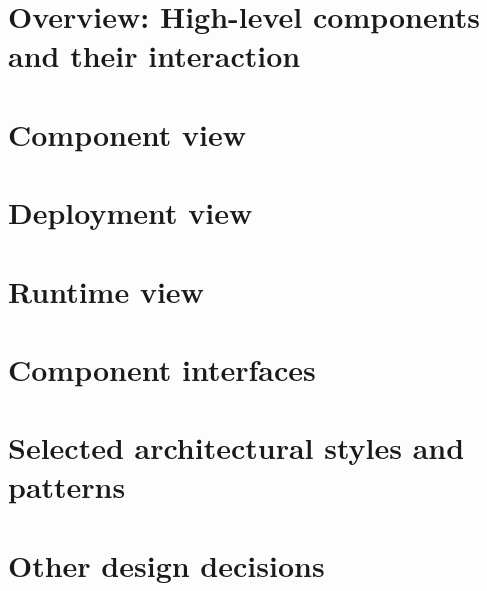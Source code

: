 \section{Overview: High-level components and their interaction}
\label{s:overview}%

\section{Component view}
\label{s:component-view}%

\section{Deployment view}
\label{s:deployment-view}%


\section{Runtime view}
\label{s:runtime-view}%

\section{Component interfaces}
\label{s:component-interfaces}%

\section{Selected architectural styles and patterns}
\label{s:selected-architectural-styles-and-patterns}%

\section{Other design decisions}
\label{s:other-design-decisions}%
